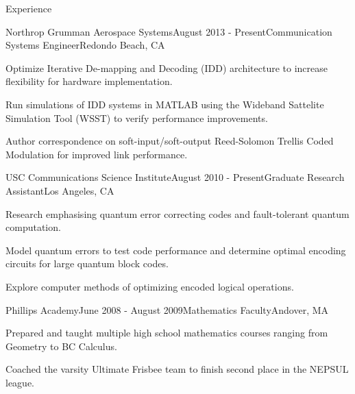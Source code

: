 \documentclass{resume} %
\begin{document}
\begin{rSection}{Experience}

\begin{rSubsection}{Northrop Grumman Aerospace Systems}{August 2013 - Present}{Communication Systems Engineer}{Redondo Beach, CA}

\item Optimize Iterative De-mapping and Decoding (IDD) architecture to increase flexibility for hardware implementation. 
\item Run simulations of IDD systems in MATLAB using the Wideband Sattelite Simulation Tool (WSST) to verify performance improvements.
\item Author correspondence on soft-input/soft-output Reed-Solomon Trellis Coded Modulation for improved link performance.
\end{rSubsection}

\begin{rSubsection}{USC Communications Science Institute}{August 2010 - Present}{Graduate Research Assistant}{Los Angeles, CA}
\item Research emphasising quantum error correcting codes and fault-tolerant quantum computation.
\item Model quantum errors to test code performance and determine optimal encoding circuits for large quantum block codes.
\item Explore computer methods of optimizing encoded logical operations.
\end{rSubsection}


\begin{rSubsection}{Phillips Academy}{June 2008 - August 2009}{Mathematics Faculty}{Andover, MA}
\item Prepared and taught multiple high school mathematics courses ranging from Geometry to BC Calculus.
\item Coached the varsity Ultimate Frisbee team to finish second place in the NEPSUL league.
\end{rSubsection}


\end{rSection}
\end{document}
